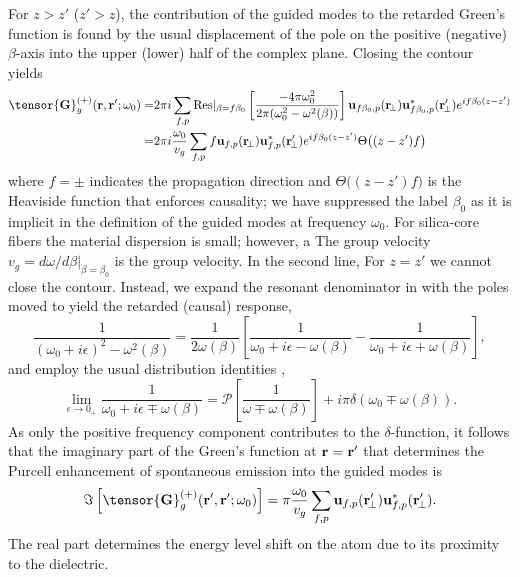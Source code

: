 \documentclass[preprint,aps,pra,onecolumn]{revtex4-1} %
\newcommand{\change}[1]{{\color{RoyalBlue} #1}}
\begin{document}
For $z>z'$ ($z'>z$), the contribution of the guided modes to the retarded Green's function is found by the 
usual displacement of the pole on the positive (negative) $\beta$-axis into the upper (lower) half of 
the complex plane. Closing the contour yields
\change{
\begin{align} 
\tensor{\mathbf{G}}^{(+)}_g(\br,\br'; \omega_0) = &2\pi i \sum_{f,p}  {\rm Res}\vert_{\beta =f\beta_0} 
\left[\frac{-4\pi \omega_0^2}{2\pi (\omega_0^2-\omega^2(\beta))}\right]  \mathbf{u}_{f\beta_0, p} 
(\br\!_\perp)\mathbf{u}^*_{f\beta_0, p} (\br_{\!\perp}^\prime)e^{if \beta_0 (z-z')} \nonumber \\
  = & 2\pi i \frac{\omega_0}{v_g } \sum_{f,p} f  \mathbf{u}_{f, p} (\br\!_\perp)\mathbf{u}^*_{f , p} 
(\br_{\!\perp}^\prime) e^{if\beta_0(z-z')} \Theta \big((z-z')f \big) 
\label{Eq::GreensGuided}
\end{align}
}where $f=\pm$ indicates the propagation direction and $\Theta \big((z-z')f \big)$ is the Heaviside function that enforces causality; we have suppressed the label $\beta_0$ as it is implicit in the definition of the guided modes at frequency $\omega_0$. For silica-core fibers the material dispersion is small; however, a The group velocity $v_g= d\omega/d\beta \vert_{\beta=\beta_0}$ is the group velocity.  In the second line, For \change{$z=z'$} we cannot close the contour. Instead, we expand the resonant denominator in  with the poles moved to yield the retarded (causal) response,
\begin{equation}
\frac{1}{(\omega_0+i\epsilon)^2-\omega^2(\beta)}=\frac{1}{2 \omega(\beta)}\left[ \frac{1}{\omega_0+ i 
\epsilon - \omega(\beta)} - \frac{1}{\omega_0+ i \epsilon + \omega(\beta)} \right],
\end{equation}
 and employ the usual distribution identities \cite{sondergaard_general_2001},
\begin{equation}
\lim_{\epsilon \rightarrow 0_+} \frac{1}{\omega_0 + i \epsilon \mp 
\omega(\beta)}=\mathcal{P}\left[\frac{1}{\omega \mp \omega(\beta)} \right] + i \pi \delta (\omega_0 \mp 
\omega(\beta)).
\end{equation}
As only the positive frequency component contributes to the $\delta$-function, it follows that the imaginary 
part of the Green's function at $\mathbf{r} = \mathbf{r}'$ that determines the Purcell enhancement of spontaneous 
emission into the guided modes is
	\begin{equation}
		\Im\left[\tensor{\mathbf{G}}^{(+)}_g(\br',\br'; \omega_0) \right] = \pi \frac{\omega_0}{v_g } \sum_{f, p} 
		\mathbf{u}_{f, p} (\br_{\!\perp}^\prime)\mathbf{u}^*_{f , p} (\br_{\!\perp}^\prime).
	\end{equation}
The real part determines the energy level shift on the atom due to its proximity to the dielectric.
\end{document}
